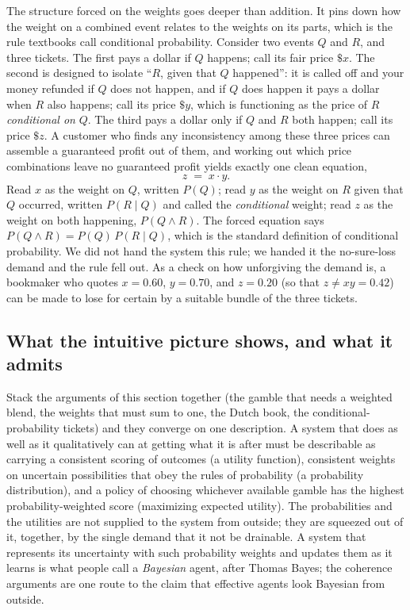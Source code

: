 \documentclass[10pt]{article}
\theoremstyle{definition}
\theoremstyle{remark}
\begin{document}
The structure forced on the weights goes deeper than addition. It pins down how the weight on a combined event relates to the weights on its parts, which is the rule textbooks call conditional probability. Consider two events $Q$ and $R$, and three tickets. The first pays a dollar if $Q$ happens; call its fair price $\$x$. The second is designed to isolate ``$R$, given that $Q$ happened'': it is called off and your money refunded if $Q$ does not happen, and if $Q$ does happen it pays a dollar when $R$ also happens; call its price $\$y$, which is functioning as the price of $R$ \emph{conditional on} $Q$. The third pays a dollar only if $Q$ and $R$ both happen; call its price $\$z$. A customer who finds any inconsistency among these three prices can assemble a guaranteed profit out of them, and working out which price combinations leave no guaranteed profit yields exactly one clean equation,
\[
z \;=\; x \cdot y .
\]
Read $x$ as the weight on $Q$, written $P(Q)$; read $y$ as the weight on $R$ given that $Q$ occurred, written $P(R \mid Q)$ and called the \emph{conditional} weight; read $z$ as the weight on both happening, $P(Q \wedge R)$. The forced equation says $P(Q \wedge R) = P(Q)\,P(R \mid Q)$, which is the standard definition of conditional probability. We did not hand the system this rule; we handed it the no-sure-loss demand and the rule fell out. As a check on how unforgiving the demand is, a bookmaker who quotes $x = 0.60$, $y = 0.70$, and $z = 0.20$ (so that $z \ne x y = 0.42$) can be made to lose for certain by a suitable bundle of the three tickets.

\subsection{What the intuitive picture shows, and what it admits}

Stack the arguments of this section together (the gamble that needs a weighted blend, the weights that must sum to one, the Dutch book, the conditional-probability tickets) and they converge on one description. A system that does as well as it qualitatively can at getting what it is after must be describable as carrying a consistent scoring of outcomes (a utility function), consistent weights on uncertain possibilities that obey the rules of probability (a probability distribution), and a policy of choosing whichever available gamble has the highest probability-weighted score (maximizing expected utility). The probabilities and the utilities are not supplied to the system from outside; they are squeezed out of it, together, by the single demand that it not be drainable. A system that represents its uncertainty with such probability weights and updates them as it learns is what people call a \emph{Bayesian} agent, after Thomas Bayes; the coherence arguments are one route to the claim that effective agents look Bayesian from outside.
\end{document}
